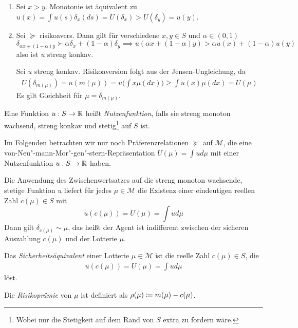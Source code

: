 \documentclass[a4paper,twoside,DIV15,BCOR12mm]{scrbook}
\newcommand{\cM}{\mathcal M}
\begin{document}
\begin{beweis}
\begin{enumerate}
\item Sei $x>y$. Monotonie ist äquivalent zu $u(x)=\int u(s) \delta_x(ds) = U(\delta_x) > U(\delta_y) = u(y)$.
\item Sei $\succeq$ risikoavers. Dann gilt für verschiedene $x,y\in S$ und $\alpha \in (0, 1)$
\[
\delta_{\alpha x + (1-\alpha) y} \succ \alpha \delta_x + (1-\alpha)\delta_y
\implies
u(\alpha x + (1-\alpha ) y) > \alpha u(x) + (1-\alpha) u(y)
\]
also ist $u$ streng konkav.

Sei $u$ streng konkav. Risikoaversion folgt aus der Jensen-Ungleichung, da
\begin{align*}
U(\delta_{m(\mu)}) = u(m(\mu)) = u\Big(\int x \mu (dx)\Big) \ge \int u(x) \mu(dx) = U(\mu)
\end{align*}
Es gilt Gleichheit für $\mu = \delta_{m(\mu)}$.
\end{enumerate}
\end{beweis}

\begin{definition}
Eine Funktion $u:S\to\mathbb{R}$ heißt \emph{Nutzenfunktion}, falls sie streng monoton wachsend, streng konkav und stetig\footnote{Wobei nur die Stetigkeit auf dem Rand von $S$ extra zu fordern wäre.} auf $S$ ist.
\end{definition}

Im Folgenden betrachten wir nur noch Präferenzrelationen $\succeq$ auf $\cM$, die eine von-Neu"-mann-Mor"-gen"-stern-Repräsentation $U(\mu) = \int u d \mu$ mit einer Nutzenfunktion $u:S\to\mathbb{R}$ haben. 

Die Anwendung des Zwischenwertsatzes auf die streng monoton wachsende, stetige Funktion $u$ liefert für jedes $\mu\in\cM$ die Existenz einer eindeutigen reellen Zahl $c(\mu)\in S$ mit
\[u(c(\mu)) = U(\mu) = \int ud\mu\]
Dann gilt $\delta_{c(\mu)} \sim \mu$, das heißt der Agent ist indifferent zwischen der sicheren Auszahlung $c(\mu)$ und der Lotterie $\mu$. 

\begin{definition}
Das \emph{Sicherheitsäquivalent} einer Lotterie $\mu\in \cM$ ist die reelle Zahl $c(\mu)\in S$, die 
\begin{align*}
u(c(\mu)) = U(\mu) = \int ud\mu
\end{align*}
löst.

Die \emph{Risikoprämie} von $\mu$ ist definiert als $\rho(\mu)\da m(\mu) - c(\mu)$.
\end{definition}
\end{document}
